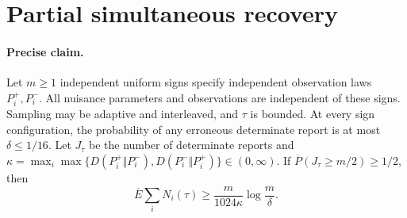 \section{Partial simultaneous recovery}
\label{app:partial}

\paragraph{Precise claim.}
Let $m\ge1$ independent uniform signs specify independent observation laws
$P_i^+,P_i^-$. All nuisance parameters and observations are independent of
these signs. Sampling may be adaptive and interleaved, and $\tau$ is bounded.
At every sign configuration, the probability of any erroneous determinate
report is at most $\delta\le1/16$. Let $J_\tau$ be the number of determinate
reports and
$\kappa=\max_i\max\{D(P_i^+\Vert P_i^-),D(P_i^-\Vert P_i^+)\}\in(0,\infty)$.
If $\overline P(J_\tau\ge m/2)\ge1/2$, then
\[
 \overline E\sum_iN_i(\tau)\ge\frac{m}{1024\kappa}\log\frac m\delta.
\]

